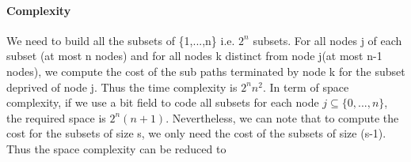 \documentclass[../report.tex]{subfiles}
\begin{document}
\paragraph{Complexity}\hfill \break
   We need to build all the subsets of \{1,...,n\} i.e. $2^n$ subsets. For all nodes j of each subset (at most n nodes) and for all nodes k distinct from node j(at most n-1 nodes), we compute the cost of the sub paths terminated by node k for the subset deprived of node j.
Thus the time complexity is $2^n n^2$.
\newline{} In term of space complexity, if we use a bit field to code all subsets for each node $j \subseteq \{0,...,n\}$, the required space is $2^n (n+1)$.
\newline{} Nevertheless, we can note that to compute the cost for the subsets of size s, we only need the cost of the subsets of size (s-1). Thus the space complexity can be reduced to 
\end{document}
